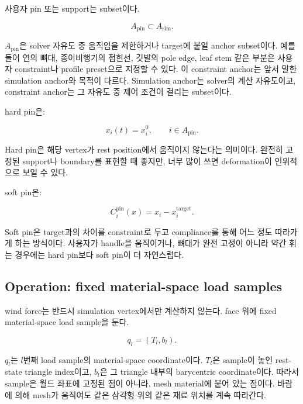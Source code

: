 \documentclass[11pt,a4paper]{article}
\begin{document}
사용자 pin 또는 support는 subset이다.

\begin{equation}
A_{\mathrm{pin}}\subset A_{\mathrm{sim}}.
\end{equation}

$A_{\mathrm{pin}}$은 solver 자유도 중 움직임을 제한하거나 target에 붙일 anchor subset이다.
예를 들어 연의 뼈대, 종이비행기의 접힌선, 깃발의 pole edge, leaf stem 같은 부분은 사용자 constraint나 profile preset으로 지정할 수 있다.
이 constraint anchor는 앞서 말한 simulation anchor와 목적이 다르다.
Simulation anchor는 solver의 계산 자유도이고, constraint anchor는 그 자유도 중 제어 조건이 걸리는 subset이다.

hard pin은:

\begin{equation}
x_i(t)=x_i^0,\qquad i\in A_{\mathrm{pin}}.
\end{equation}

Hard pin은 해당 vertex가 rest position에서 움직이지 않는다는 의미이다.
완전히 고정된 support나 boundary를 표현할 때 좋지만, 너무 많이 쓰면 deformation이 인위적으로 보일 수 있다.

soft pin은:

\begin{equation}
C_i^{\mathrm{pin}}(x)=x_i-x_i^{\mathrm{target}}.
\end{equation}

Soft pin은 target과의 차이를 constraint로 두고 compliance를 통해 어느 정도 따라가게 하는 방식이다.
사용자가 handle을 움직이거나, 뼈대가 완전 고정이 아니라 약간 휘는 경우에는 hard pin보다 soft pin이 더 자연스럽다.

\subsection*{Operation: fixed material-space load samples}

wind force는 반드시 simulation vertex에서만 계산하지 않는다. face 위에 fixed material-space load sample을 둔다.

\begin{equation}
q_l=(T_l,b_l).
\end{equation}

$q_l$는 $l$번째 load sample의 material-space coordinate이다.
$T_l$은 sample이 놓인 rest-state triangle index이고, $b_l$은 그 triangle 내부의 barycentric coordinate이다.
따라서 sample은 월드 좌표에 고정된 점이 아니라, mesh material에 붙어 있는 점이다.
바람에 의해 mesh가 움직여도 같은 삼각형 위의 같은 재료 위치를 계속 따라간다.
\end{document}
